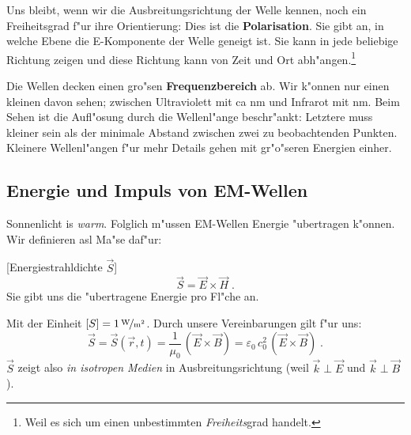 \documentclass[twoside,a4paper]{book}
\newenvironment{Def}[1][]{%
\definecolor{shadethmcolor}{rgb}{.95,.95,.95}%
\definecolor{shaderulecolor}{rgb}{0.8,0.8,0.8}%
\setlength{\shadeboxrule}{1pt}%
\begin{Defi}[#1]%
 }{\end{Defi}}
\newcommand{\abs}[0]{\bigskip \noindent}
\begin{document}
\abs
Uns bleibt, wenn wir die Ausbreitungsrichtung der Welle kennen, noch
ein Freiheitsgrad f"ur ihre Orientierung: Dies ist die
\textbf{Polarisation}. Sie gibt an, in welche Ebene die E-Komponente
der Welle geneigt ist. Sie kann in jede beliebige Richtung zeigen und
diese Richtung kann von Zeit und Ort abh"angen.\footnote{Weil es sich
  um einen unbestimmten \emph{Freiheits}grad handelt.}

\abs
Die Wellen decken einen gro"sen \textbf{Frequenzbereich} ab. Wir k"onnen nur
einen kleinen davon sehen; zwischen Ultraviolett mit ca \unit[400]{nm}
und Infrarot mit \unit[800]{nm}. Beim Sehen ist die Aufl"osung durch
die Wellenl"ange beschr"ankt: Letztere muss kleiner sein als der
minimale Abstand zwischen zwei zu beobachtenden Punkten. Kleinere
Wellenl"angen f"ur mehr Details gehen mit gr"o"seren Energien einher.








\subsection{Energie und Impuls von EM-Wellen}
\label{kap_energie-und-impuls-von-em}

Sonnenlicht is \emph{warm}. Folglich m"ussen EM-Wellen Energie
"ubertragen k"onnen. Wir definieren asl Ma"se daf"ur:
\begin{Def}
   [Energiestrahldichte $\vec S$]
   \begin{equation}
      \label{eqn_def_energiestrahldichte}
      \vec S = \vec E \times \vec H \;.
   \end{equation}
Sie gibt uns die "ubertragene Energie pro Fl"che an.
\end{Def}
Mit der Einheit $[S] = \unitfrac[1]{W}{m^2}$. Durch unsere Vereinbarungen gilt f"ur uns:
\begin{equation}
   \label{eq:17}
         \vec S = \vec S(\vec r,t) = \frac{1}{\mu_0} \, \left ( \vec E
         \times \vec B \right ) = \varepsilon_0 \, c_0^2 \, \left (
         \vec E \times \vec B \right ) \;.
\end{equation}
$\vec S$ zeigt also \emph{in isotropen Medien} in Ausbreitungsrichtung (weil $\vec k \perp \vec
E$ und $\vec k \perp \vec B$).
\end{document}
